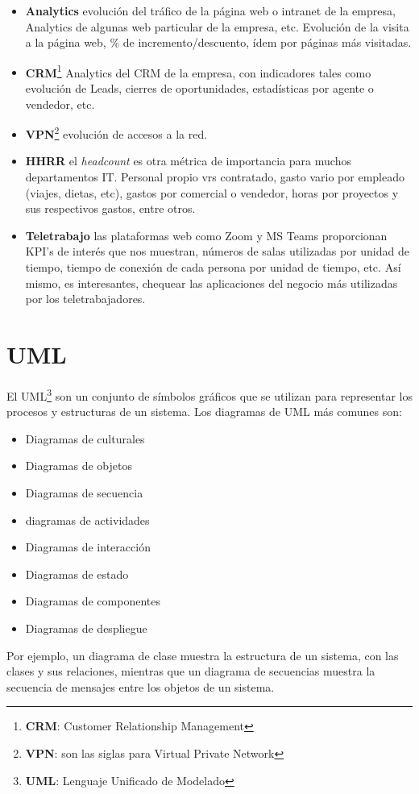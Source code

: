 \documentclass[12pt]{article}
\begin{document}
\begin{enumerate}
  \begin{itemize}
    \item \textbf{Analytics} evolución del tráfico de la página web o intranet de la empresa, Analytics de algunas web particular de la empresa, etc. Evolución de la visita a la página web, \% de incremento/descuento, ídem por páginas más visitadas.

    \item \textbf{CRM}\footnote{\textbf{CRM}: Customer Relationship Management} Analytics del CRM de la empresa, con indicadores tales como evolución de Leads, cierres de oportunidades, estadísticas por agente o vendedor, etc.

    \item \textbf{VPN}\footnote{\textbf{VPN}: son las siglas para Virtual Private Network} evolución de accesos a la red. 

    \item \textbf{HHRR} el \textit{headcount} es otra métrica de importancia para muchos departamentos IT. Personal propio vrs contratado, gasto vario por empleado (viajes, dietas, etc), gastos por comercial o vendedor, horas por proyectos y sus respectivos gastos, entre otros.

    \item \textbf{Teletrabajo} las plataformas web como Zoom y MS Teams proporcionan KPI's de interés que nos muestran, números de salas utilizadas por unidad de tiempo, tiempo de conexión de cada persona por unidad de tiempo, etc. Así mismo, es interesantes, chequear las aplicaciones del negocio más utilizadas por los teletrabajadores.
  \end{itemize}

\end{enumerate}

\section{UML}

El UML\footnote{\textbf{UML}: Lenguaje  Unificado de Modelado} son un conjunto de símbolos gráficos que se utilizan para representar los procesos y estructuras de un sistema. Los diagramas de UML más comunes son: 
\begin{itemize}
  \item Diagramas de culturales
  \item Diagramas de objetos
  \item Diagramas de secuencia
  \item diagramas de actividades
  \item Diagramas de interacción
  \item Diagramas de estado
  \item Diagramas de componentes
  \item Diagramas de despliegue
\end{itemize}
Por ejemplo, un diagrama de clase muestra la estructura de un sistema, con las clases y sus relaciones, mientras que un diagrama de secuencias muestra la secuencia de mensajes entre los objetos de un sistema.
\end{document}
